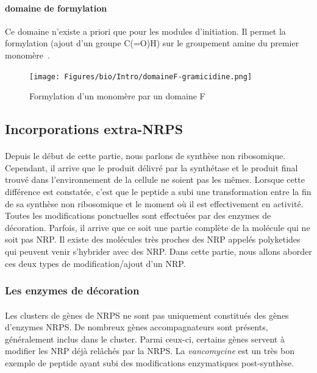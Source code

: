 \documentclass[12pt,french,twoside]{report}
\begin{document}
\paragraph{domaine de formylation}

Ce domaine n'existe a priori que pour les modules d'initiation.
Il permet la formylation (ajout d'un groupe C(=O)H) sur le groupement amine du premier monomère~\cite{schonafinger_amide_2007}.

\begin{figure}[h!]
  \begin{center}
    \texttt{[image: Figures/bio/Intro/domaineF-gramicidine.png]}
    \caption{\label{domaine_F}Formylation d'un monomère par un domaine F}
  \end{center}
\end{figure}


\subsection{Incorporations extra-NRPS}

\paragraph{}Depuis le début de cette partie, nous parlons de synthèse non ribosomique.
Cependant, il arrive que le produit délivré par la synthétase et le produit final trouvé dans l'environnement de la cellule ne soient pas les mêmes.
Lorsque cette différence est constatée, c'est que le peptide a subi une transformation entre la fin de sa synthèse non ribosomique et le moment où il est effectivement en activité.
Toutes les modifications ponctuelles sont effectuées par des enzymes de décoration.
Parfois, il arrive que ce soit une partie complète de la molécule qui ne soit pas NRP.
Il existe des molécules très proches des NRP appelés polyketides qui peuvent venir s'hybrider avec des NRP.
Dans cette partie, nous allons aborder ces deux types de modification/ajout d'un NRP.


\subsubsection{Les enzymes de décoration}

\paragraph{}Les clusters de gènes de NRPS ne sont pas uniquement constitués des gènes d'enzymes NRPS.
De nombreux gènes accompagnateurs sont présents, généralement inclus dans le cluster.
Parmi ceux-ci, certains gènes servent à modifier les NRP déjà relâchés par la NRPS.
La \textit{vancomycine} est un très bon exemple de peptide ayant subi des modifications enzymatiques post-synthèse.
\end{document}
